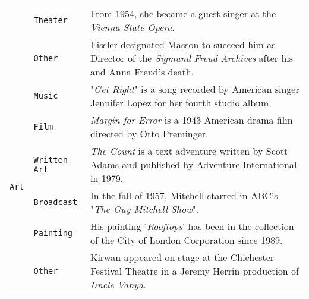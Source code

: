 \documentclass[11pt,a4paper, dvipsnames]{article}
\begin{document}
\begin{longtable}{clp{9.5cm}}
                                              & \texttt{\color{TealBlue}Theater}             & From 1954, she became a guest singer at the \textit{\color{TealBlue}Vienna State Opera}.                                                                                \\ \cmidrule(r){2-2} \cmidrule(r){3-3}
                                              & \texttt{\color{TealBlue}Other}               & Eissler designated Masson to succeed him as Director of the \textit{\color{TealBlue}Sigmund Freud Archives} after his and Anna Freud's death.                           \\ \midrule
\multirow{6}{*}{\texttt{\color{Plum}Art}}                          & \texttt{\color{Plum}Music}               & "\textit{\color{Plum}Get Right}" is a song recorded by American singer Jennifer Lopez for her fourth studio album.                                                  \\ \cmidrule(r){2-2} \cmidrule(r){3-3}
                                              & \texttt{\color{Plum}Film}                & \textit{\color{Plum}Margin for Error} is a 1943 American drama film directed by Otto Preminger.                                                                     \\ \cmidrule(r){2-2} \cmidrule(r){3-3}
                                              & \texttt{\color{Plum}Written Art}        & \textit{\color{Plum}The Count} is a text adventure written by Scott Adams and published by Adventure International in 1979.                                         \\ \cmidrule(r){2-2} \cmidrule(r){3-3}
                                              & \texttt{\color{Plum}Broadcast}           & In the fall of 1957, Mitchell starred in ABC's "\textit{\color{Plum}The Guy Mitchell Show}".                                                                        \\ \cmidrule(r){2-2} \cmidrule(r){3-3}
                                              & \texttt{\color{Plum}Painting}            & His painting '\textit{\color{Plum}Rooftops}' has been in the collection of the City of London Corporation since 1989.                                               \\ \cmidrule(r){2-2} \cmidrule(r){3-3}
                                              & \texttt{\color{Plum}Other}               & Kirwan appeared on stage at the Chichester Festival Theatre in a Jeremy Herrin production of \textit{\color{Plum}Uncle Vanya}.                                      \\ \midrule

\end{longtable}
\end{document}
